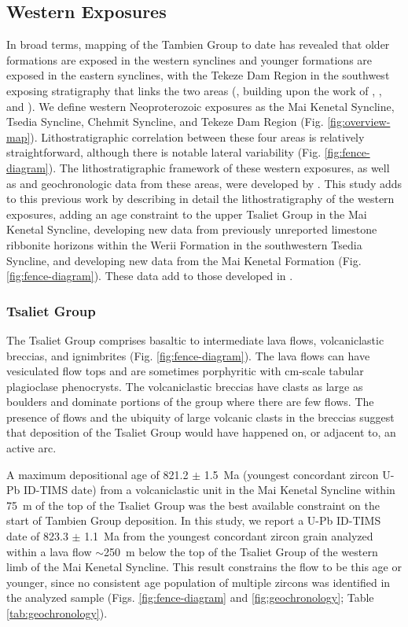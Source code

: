 \subsection{Western Exposures}

In broad terms, mapping of the Tambien Group to date has revealed that older formations are exposed in the western synclines and younger formations are exposed in the eastern synclines, with the Tekeze Dam Region in the southwest exposing stratigraphy that links the two areas (\citealp{Swanson-Hysell2015a}, building upon the work of \citealp{Beyth1972a}, \citealp{Hailu1975a}, and \citealp{Garland1980a}). We define western Neoproterozoic exposures as the Mai Kenetal Syncline, Tsedia Syncline, Chehmit Syncline, and Tekeze Dam Region (Fig. \ref{fig:overview-map}). Lithostratigraphic correlation between these four areas is relatively straightforward, although there is notable lateral variability (Fig. \ref{fig:fence-diagram}). The lithostratigraphic framework of these western exposures, as well as \dC and geochronologic data from these areas, were developed by \citet{Swanson-Hysell2015a}. This study adds to this previous work by describing in detail the lithostratigraphy of the western exposures, adding an age constraint to the upper Tsaliet Group in the Mai Kenetal Syncline, developing new \dC data from previously unreported limestone ribbonite horizons within the Werii Formation in the southwestern Tsedia Syncline, and developing new \SrSr data from the Mai Kenetal Formation (Fig. \ref{fig:fence-diagram}). These \SrSr data add to those developed in \citet{Miller2009a}.

\subsubsection{Tsaliet Group}

The Tsaliet Group comprises basaltic to intermediate lava flows, volcaniclastic breccias, and ignimbrites (Fig. \ref{fig:fence-diagram}). The lava flows can have vesiculated flow tops and are sometimes porphyritic with cm-scale tabular plagioclase phenocrysts. The volcaniclastic breccias have clasts as large as boulders and dominate portions of the group where there are few flows. The presence of flows and the ubiquity of large volcanic clasts in the breccias suggest that deposition of the Tsaliet Group would have happened on, or adjacent to, an active arc.

A maximum depositional age of 821.2 $\pm$ 1.5~Ma (youngest concordant zircon U-Pb ID-TIMS date) from a volcaniclastic unit in the Mai Kenetal Syncline within 75~m of the top of the Tsaliet Group \citep{Swanson-Hysell2015a} was the best available constraint on the start of Tambien Group deposition. In this study, we report a U-Pb ID-TIMS date of 823.3 $\pm$ 1.1~Ma from the youngest concordant zircon grain analyzed within a lava flow $\sim$250~m below the top of the Tsaliet Group of the western limb of the Mai Kenetal Syncline. This result constrains the flow to be this age or younger, since no consistent age population of multiple zircons was identified in the analyzed sample (Figs. \ref{fig:fence-diagram} and \ref{fig:geochronology}; Table \ref{tab:geochronology}).

